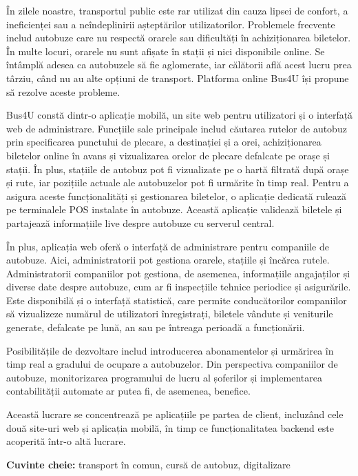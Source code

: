 În zilele noastre, transportul public este rar utilizat din cauza lipsei de confort, a ineficienței sau a neîndeplinirii așteptărilor utilizatorilor. Problemele frecvente includ autobuze care nu respectă orarele sau dificultăți în achiziționarea biletelor. În multe locuri, orarele nu sunt afișate în stații și nici disponibile online. Se întâmplă adesea ca autobuzele să fie aglomerate, iar călătorii află acest lucru prea târziu, când nu au alte opțiuni de transport. Platforma online Bus4U își propune să rezolve aceste probleme.

Bus4U constă dintr-o aplicație mobilă, un site web pentru utilizatori și o interfață web de administrare. Funcțiile sale principale includ căutarea rutelor de autobuz prin specificarea punctului de plecare, a destinației și a orei, achiziționarea biletelor online în avans și vizualizarea orelor de plecare defalcate pe orașe și stații. În plus, stațiile de autobuz pot fi vizualizate pe o hartă filtrată după orașe și rute, iar pozițiile actuale ale autobuzelor pot fi urmărite în timp real. Pentru a asigura aceste funcționalități și gestionarea biletelor, o aplicație dedicată rulează pe terminalele POS instalate în autobuze. Această aplicație validează biletele și partajează informațiile live despre autobuze cu serverul central.

În plus, aplicația web oferă o interfață de administrare pentru companiile de autobuze. Aici, administratorii pot gestiona orarele, stațiile și încărca rutele. Administratorii companiilor pot gestiona, de asemenea, informațiile angajaților și diverse date despre autobuze, cum ar fi inspecțiile tehnice periodice și asigurările. Este disponibilă și o interfață statistică, care permite conducătorilor companiilor să vizualizeze numărul de utilizatori înregistrați, biletele vândute și veniturile generate, defalcate pe lună, an sau pe întreaga perioadă a funcționării.

Posibilitățile de dezvoltare includ introducerea abonamentelor și urmărirea în timp real a gradului de ocupare a autobuzelor. Din perspectiva companiilor de autobuze, monitorizarea programului de lucru al șoferilor și implementarea contabilității automate ar putea fi, de asemenea, benefice.

Această lucrare se concentrează pe aplicațiile pe partea de client, incluzând cele două site-uri web și aplicația mobilă, în timp ce funcționalitatea backend este acoperită într-o altă lucrare.

\textbf{Cuvinte cheie:} transport în comun, cursă de autobuz, digitalizare